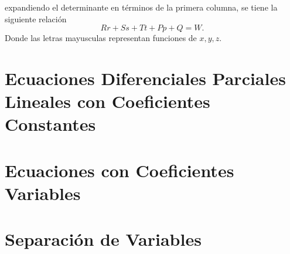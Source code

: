expandiendo el determinante en términos de la primera columna, se tiene la siguiente relación
	$$Rr + Ss + Tt + Pp + Q = W.$$
Donde las letras mayusculas representan funciones de $x,y,z$.

\section{Ecuaciones Diferenciales Parciales Lineales con Coeficientes Constantes}

\section{Ecuaciones con Coeficientes Variables}

\section{Separación de Variables}




























































